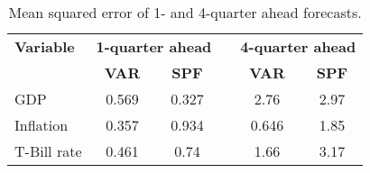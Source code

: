 \begin{table}
\centering
\begin{tabular}{lccccc}
\toprule \toprule\textbf{Variable} & \multicolumn{2}{c}{\textbf{1-quarter ahead} } && \multicolumn{2}{c}{ \textbf{4-quarter ahead}} \\ 
\cline{2-3}  \cline{5-6} 
& \textbf{VAR} & \textbf{SPF}  && \textbf{VAR} & \textbf{SPF} \\ 
\midrule GDP & 0.569  & 0.327 && 2.76  & 2.97 \\ 
Inflation & 0.357  & 0.934 && 0.646  & 1.85 \\ 
T-Bill rate & 0.461  & 0.74 && 1.66  & 3.17 \\ \bottomrule 
\end{tabular} 
\caption{Mean squared error of 1- and 4-quarter ahead forecasts.} 
\label{tab:spf_compare} 
\end{table} 
